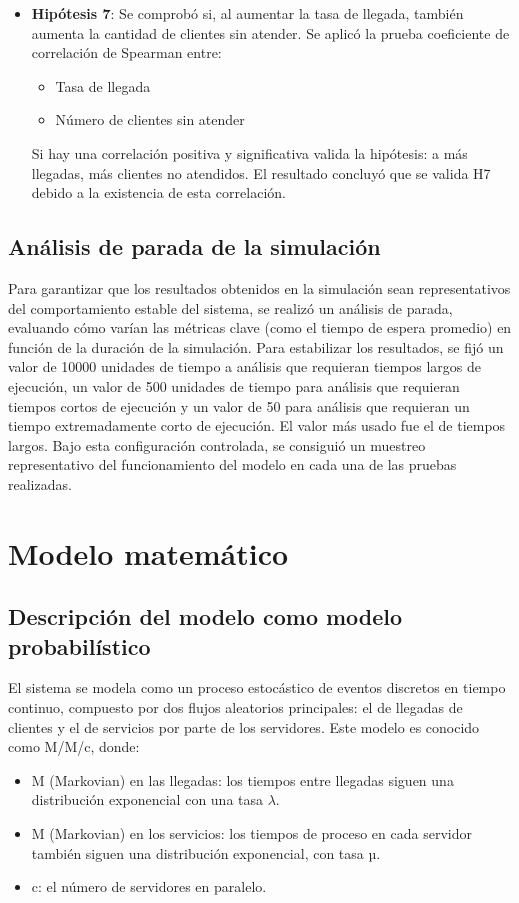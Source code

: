 \documentclass[12pt,a4paper]{article}
\begin{document}
\begin{itemize}
\item \textbf{Hipótesis 7}:  Se comprobó si, al aumentar la tasa de llegada, también aumenta la cantidad de clientes sin atender. Se aplicó la prueba coeficiente de correlación de Spearman entre:
\begin{itemize}
\item Tasa de llegada
\item Número de clientes sin atender
\end{itemize}
Si hay una correlación positiva y significativa valida la hipótesis: a más llegadas, más clientes no atendidos. El resultado concluyó que se valida H7 debido a la existencia de esta correlación.
\end{itemize}

\subsection{Análisis de parada de la simulación}
Para garantizar que los resultados obtenidos en la simulación sean representativos del comportamiento estable del sistema,
se realizó un análisis de parada, evaluando cómo varían las métricas clave (como el tiempo de espera promedio) en función de
la duración de la simulación. Para estabilizar los resultados, se fijó un valor de 10000 unidades de tiempo a análisis que
requieran tiempos largos de ejecución, un valor de 500 unidades de tiempo para análisis que requieran tiempos cortos de
ejecución y un valor de 50 para análisis que requieran un tiempo extremadamente corto de ejecución. El valor más usado fue
el de tiempos largos. Bajo esta configuración controlada, se consiguió un muestreo representativo del funcionamiento del
modelo en cada una de las pruebas realizadas.

\section{Modelo matemático}
\subsection{Descripción del modelo como modelo probabilístico}
El sistema se modela como un proceso estocástico de eventos discretos en tiempo continuo, compuesto por dos flujos aleatorios
principales: el de llegadas de clientes y el de servicios por parte de los servidores. Este modelo es conocido como M/M/c, donde:
\begin{itemize}
\item M (Markovian) en las llegadas: los tiempos entre llegadas siguen una distribución exponencial con una tasa $\lambda$.
\item M (Markovian) en los servicios: los tiempos de proceso en cada servidor también siguen una distribución exponencial, con tasa µ.
\item c: el número de servidores en paralelo.
\end{itemize}
\end{document}
